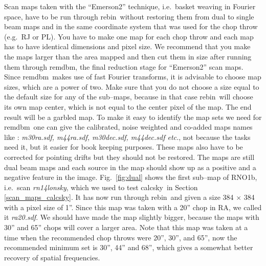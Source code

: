 \documentclass[twoside,11pt]{article}
\newcommand{\task}[1]{\textsf{#1}}
\newcommand{\rebin}{\xref{\task{rebin}}{sun216}{REBIN}}
\newcommand{\remdbm}{\xref{\task{remdbm}}{sun216}{REMDBM}}
\newcommand{\calcsky}{\xref{\task{calcsky}}{sun216}{CALCSKY}}
\newcommand{\xref}[3]{#1}
\renewcommand{\_}{\texttt{\symbol{95}}}
\begin{document}
Scan maps taken with the ``Emerson2'' technique, i.e.\ basket weaving
in Fourier space, have to be run through \rebin\ without restoring
them from dual to single beam maps and in the same coordinate system
that was used for the chop throw (e.g.\ RJ or PL).  You have to make
one map for each chop throw and each map has to have identical
dimensions and pixel size.  We recommend that you make the maps larger
than the area mapped and then cut them in size after running them
through \remdbm, the final reduction stage for ``Emerson2'' scan maps. 
Since \remdbm\ makes use of fast Fourier transforms, it is advisable
to choose map sizes, which are a power of two.  Make sure that you do
not choose a size equal to the default size for any of the sub--maps,
because in that case \rebin\ will choose its own map center, which is
not equal to the center pixel of the map. The end result will be a
garbled map.  To make it easy to identify the map sets we need for
\remdbm\ one can give the calibrated, noise weighted and co-added maps
names like : {\it m30ra.sdf, m44ra.sdf, m30dec.sdf, m44dec.sdf etc.},
not because the tasks need it, but it easier for book keeping
purposes.  These maps also have to be corrected for pointing drifts
but they should not be restored.  The maps are still dual beam maps
and each source in the map should show up as a positive and a negative
feature in the image.  Fig.\ \ref{fig:dual} shows the first sub--map
of RNO1b, i.e.\ scan {\it rn14\_lon\_sky}, which we used to test
\calcsky\ in Section \ref{scan_maps_calcsky}.  It has now run through
\rebin\ and given a size 384 $\times$ 384 with a pixel size of 1''. 
Since this map was taken with a 20'' chop in RA, we called it {\it
ra20.sdf}.  We should have made the map slightly bigger, because the
maps with 30'' and 65'' chops will cover a larger area.  Note that
this map was taken at a time when the recommended chop throws were
20'', 30'', and 65'', now the recommended minimum set is 30'', 44''
and 68'', which gives a somewhat better recovery of spatial
frequencies.
\end{document}
